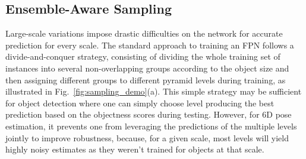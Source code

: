 

\subsection{Ensemble-Aware Sampling}
\label{sec:ea_sampling}


Large-scale variations impose drastic difficulties on the network for accurate prediction for every scale. The standard approach to training an FPN follows a divide-and-conquer strategy, consisting of dividing the whole training set of instances into several non-overlapping groups according to the object size and then assigning different groups to different pyramid levels during training, as illustrated in Fig.~\ref{fig:sampling_demo}(a). This simple strategy may be sufficient for object detection where one can simply choose level producing the best prediction based on the objectness scores during testing. However, for 6D pose estimation, it prevents one from leveraging the predictions of the multiple levels jointly to improve robustness, because, for a given scale, most levels will yield highly noisy estimates as they weren't trained for objects at that scale.



